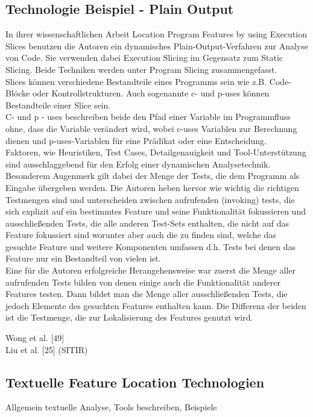 \documentclass[runningheads,a4paper]{llncs}
\begin{document}
\subsection*{Technologie Beispiel - Plain Output}
In ihrer wissenschaftlichen Arbeit Location Program Features by using  Execution Slices benutzen die Autoren ein dynamisches Plain-Output-Verfahren zur Analyse von Code. Sie verwenden dabei Execution Slicing im Gegensatz zum Static Slicing. Beide 
Techniken werden unter Program Slicing zusammengefasst.\\
Slices können verschiedene Bestandteile eines Programms sein wie z.B. Code-Blöcke oder Kontrollstrukturen. Auch sogenannte c- und p-uses können Bestandteile einer Slice sein.\\ C- und p - uses beschreiben beide den Pfad einer Variable im Programmfluss ohne, dass die Variable verändert wird, wobei c-uses Variablen zur Berechnung dienen und p-uses-Variablen für eine Prädikat oder eine Entscheidung.\\
Faktoren, wie Heuristiken, Test Cases, Detailgenauigkeit und Tool-Unterstützung sind ausschlaggebend für den Erfolg einer dynamischen Analysetechnik. \\
Besonderem Augenmerk gilt dabei der Menge der Tests, die dem Programm als Eingabe übergeben werden. Die Autoren heben hervor wie wichtig die richtigen Testmengen sind und unterscheiden zwischen aufrufenden (invoking) tests, die sich explizit auf ein bestimmtes Feature und seine Funktionalität fokussieren und ausschließenden Tests, die alle anderen Test-Sets enthalten, die nicht auf das Feature fokussiert sind worunter aber auch die zu finden sind, welche das gesuchte Feature und weitere Komponenten umfassen d.h. Tests bei denen das Feature nur ein Bestandteil von vielen ist.
\\ Eine für die Autoren erfolgreiche Herangehensweise war zuerst die Menge aller aufrufenden Tests bilden von denen einige auch die Funktionalität anderer Features testen. Dann bildet man die Menge aller ausschließenden Tests, die jedoch Elemente des gesuchten Features enthalten kann. Die Differenz der beiden ist die Testmenge, die zur Lokalisierung des Features genutzt wird. 


Wong et al. [49]\\
Liu et al. [25] (SITIR)

\subsection{Textuelle Feature Location Technologien}
Allgemein textuelle Analyse, Tools beschreiben, Beispiele
\end{document}
